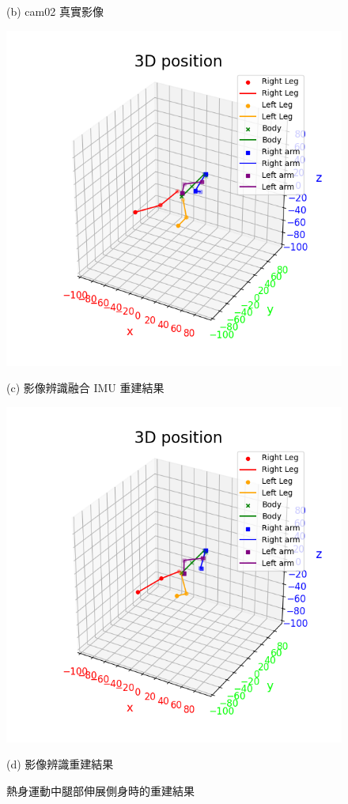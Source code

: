 \begin{figure}[!ht]
\begin{minipage}{.5\textwidth}
       \caption*{(b) cam02 真實影像}
    \end{minipage}
    \begin{minipage}{.5\textwidth}
       \centering
       \includegraphics[width=.95\linewidth]{figure/ch4_fig_warm_result_with2.png}
       \caption*{(c) 影像辨識融合 IMU 重建結果}
    \end{minipage}%
    \begin{minipage}{.5\textwidth}
       \centering
       \includegraphics[width=.95\linewidth]{figure/ch4_fig_warm_result_no2.png}
       \caption*{(d) 影像辨識重建結果}
    \end{minipage}
   \caption[熱身運動中腿部伸展側身時的重建結果]{熱身運動中腿部伸展側身時的重建結果}
   \label{ch4_fig_warm_side}
\end{figure}

